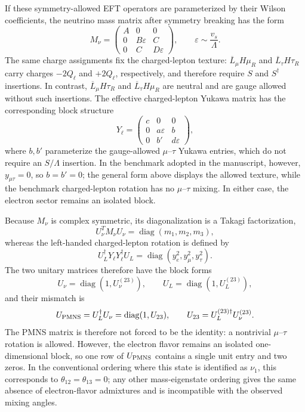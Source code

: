 \documentclass[12pt,a4paper]{article}
\begin{document}
If these symmetry-allowed EFT operators are parameterized by their Wilson coefficients, the neutrino mass matrix after symmetry breaking has the form
\[
M_\nu=
\begin{pmatrix}
A&0&0\\
0&B\varepsilon&C\\
0&C&D\varepsilon
\end{pmatrix},
\qquad \varepsilon\sim\frac{v_s}{\Lambda}.
\]
The same charge assignments fix the charged-lepton texture: \(\overline L_\mu H\mu_R\) and \(\overline L_\tau H\tau_R\) carry charges \(-2Q_\ell\) and \(+2Q_\ell\), respectively, and therefore require \(S\) and \(S^\dagger\) insertions. In contrast, \(\overline L_\mu H\tau_R\) and \(\overline L_\tau H\mu_R\) are neutral and are gauge allowed without such insertions.
The effective charged-lepton Yukawa matrix has the corresponding block structure
\[
Y_\ell=
\begin{pmatrix}
c&0&0\\
0&a\varepsilon&b\\
0&b'&d\varepsilon
\end{pmatrix},
\]
where \(b,b'\) parameterize the gauge-allowed \(\mu\)--\(\tau\) Yukawa entries, which do not require an \(S/\Lambda\) insertion. In the benchmark adopted in the manuscript, however, \(y_{\mu\tau}=0\), so \(b=b'=0\); the general form above displays the allowed texture, while the benchmark charged-lepton rotation has no \(\mu\)--\(\tau\) mixing. In either case, the electron sector remains an isolated block.

Because \(M_\nu\) is complex symmetric, its diagonalization is a Takagi factorization,
\[
U_\nu^T M_\nu U_\nu=\operatorname{diag}(m_1,m_2,m_3),
\]
whereas the left-handed charged-lepton rotation is defined by
\[
U_L^\dagger Y_\ell Y_\ell^\dagger U_L
=\operatorname{diag}(y_e^2,y_\mu^2,y_\tau^2).
\]
The two unitary matrices therefore have the block forms
\[
U_\nu=\operatorname{diag}(1,U_\nu^{(23)}),\qquad
U_L=\operatorname{diag}(1,U_L^{(23)}),
\]
and their mismatch is
\[
U_{\rm PMNS}=U_L^\dagger U_\nu
=\operatorname{diag}(1,U_{23}),\qquad
U_{23}=U_L^{(23)\dagger}U_\nu^{(23)}.
\]
The PMNS matrix is therefore not forced to be the identity: a nontrivial \(\mu\)--\(\tau\) rotation is allowed. However, the electron flavor remains an isolated one-dimensional block, so one row of \(U_{\rm PMNS}\) contains a single unit entry and two zeros. In the conventional ordering where this state is identified as \(\nu_1\), this corresponds to \(\theta_{12}=\theta_{13}=0\); any other mass-eigenstate ordering gives the same absence of electron-flavor admixtures and is incompatible with the observed mixing angles.
\end{document}
